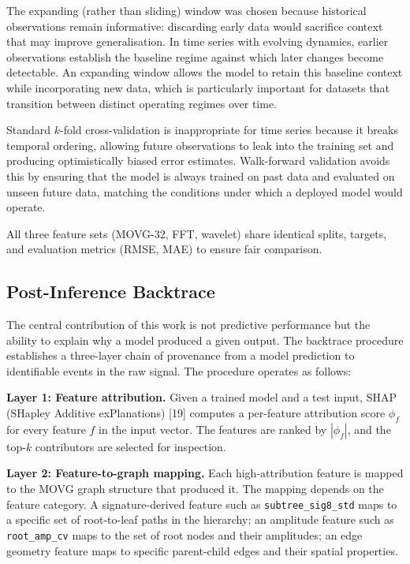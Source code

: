 \documentclass[a4paper,12pt]{article}
\begin{document}
The expanding (rather than sliding) window was chosen because historical observations remain informative: discarding early data would sacrifice context that may improve generalisation. In time series with evolving dynamics, earlier observations establish the baseline regime against which later changes become detectable. An expanding window allows the model to retain this baseline context while incorporating new data, which is particularly important for datasets that transition between distinct operating regimes over time.

Standard $k$-fold cross-validation is inappropriate for time series because it breaks temporal ordering, allowing future observations to leak into the training set and producing optimistically biased error estimates. Walk-forward validation avoids this by ensuring that the model is always trained on past data and evaluated on unseen future data, matching the conditions under which a deployed model would operate.

All three feature sets (MOVG-32, FFT, wavelet) share identical splits, targets, and evaluation metrics (RMSE, MAE) to ensure fair comparison.

\subsection{Post-Inference Backtrace}
\label{sec:backtrace}

The central contribution of this work is not predictive performance but the ability to explain why a model produced a given output. The backtrace procedure establishes a three-layer chain of provenance from a model prediction to identifiable events in the raw signal. The procedure operates as follows:

\textbf{Layer 1: Feature attribution.} Given a trained model and a test input, SHAP (SHapley Additive exPlanations) [19] computes a per-feature attribution score $\phi_f$ for every feature $f$ in the input vector. The features are ranked by $|\phi_f|$, and the top-$k$ contributors are selected for inspection.

\textbf{Layer 2: Feature-to-graph mapping.} Each high-attribution feature is mapped to the MOVG graph structure that produced it. The mapping depends on the feature category. A signature-derived feature such as \texttt{subtree\_sig8\_std} maps to a specific set of root-to-leaf paths in the hierarchy; an amplitude feature such as \texttt{root\_amp\_cv} maps to the set of root nodes and their amplitudes; an edge geometry feature maps to specific parent-child edges and their spatial properties.
\end{document}
